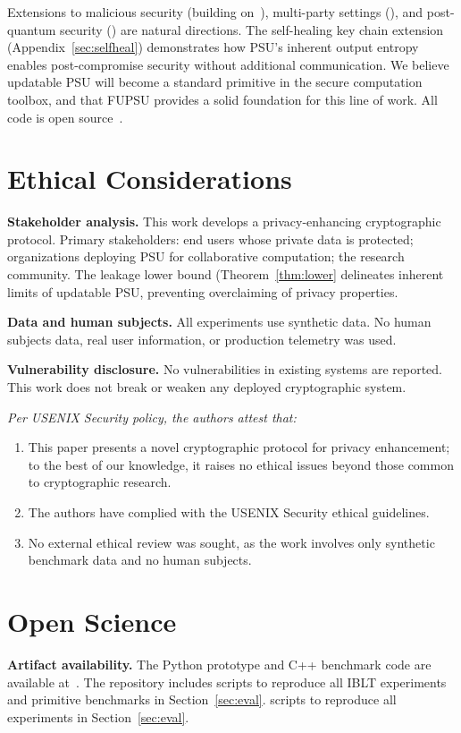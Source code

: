 Extensions to malicious security (building on~\cite{PuGT26}), multi-party
settings (\cite{Dong+25,GNT24,CGS24}), and post-quantum security
(\cite{YBH+25,RRT23}) are natural directions. The self-healing key chain
extension (Appendix~\ref{sec:selfheal}) demonstrates how PSU's inherent
output entropy enables post-compromise security without additional
communication. We believe updatable PSU will become a standard primitive
in the secure computation toolbox, and that FUPSU provides a solid
foundation for this line of work. All code is open source~\cite{code}.

\section{Ethical Considerations}

\textbf{Stakeholder analysis.} This work develops a privacy-enhancing
cryptographic protocol. Primary stakeholders: end users whose private data is
protected; organizations deploying PSU for collaborative computation; the
research community. The leakage lower bound (Theorem~\ref{thm:lower}
delineates inherent limits of updatable PSU, preventing overclaiming of
privacy properties.

\textbf{Data and human subjects.} All experiments use synthetic data. No human
subjects data, real user information, or production telemetry was used.

\textbf{Vulnerability disclosure.} No vulnerabilities in existing systems are
reported. This work does not break or weaken any deployed cryptographic system.

\smallskip
\noindent\textit{Per USENIX Security policy, the authors attest that:}
\begin{enumerate}
\item This paper presents a novel cryptographic protocol for privacy
enhancement; to the best of our knowledge, it raises no ethical issues beyond
those common to cryptographic research.
\item The authors have complied with the USENIX Security ethical guidelines.
\item No external ethical review was sought, as the work involves only
synthetic benchmark data and no human subjects.
\end{enumerate}

\section{Open Science}
\textbf{Artifact availability.} The Python prototype and C++ benchmark code
are available at~\cite{code}. The repository includes scripts to reproduce
all IBLT experiments and primitive benchmarks in Section~\ref{sec:eval}.
scripts to reproduce all experiments in Section~\ref{sec:eval}.

